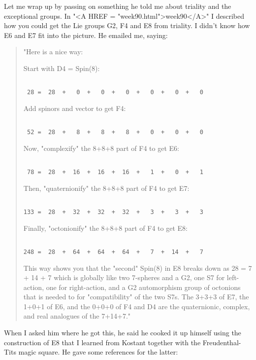 Let me wrap up by passing on something he told me about triality and the
exceptional groups.  In "<A HREF = "week90.html">week90</A>" I
described how you could get the Lie groups G2, F4 and E8 from triality.
I didn't know how E6 and E7 fit into the picture.  He emailed me,
saying:

\begin{quote}

"Here is a nice way:

Start with D4 = Spin(8):


\begin{verbatim}

 28 =  28  +   0  +   0  +   0  +   0  +   0  +   0
\end{verbatim}
    
Add spinors and vector to get F4:


\begin{verbatim}

 52 =  28  +   8  +   8  +   8  +   0  +   0  +   0
\end{verbatim}
    
Now, "complexify" the 8+8+8 part of F4 to get E6:


\begin{verbatim}

 78 =  28  +  16  +  16  +  16  +   1  +   0  +   1
\end{verbatim}
    
Then, "quaternionify" the 8+8+8 part of F4 to get E7:


\begin{verbatim}

133 =  28  +  32  +  32  +  32  +   3  +   3  +   3
\end{verbatim}
    
Finally, "octonionify" the 8+8+8 part of F4 to get E8:


\begin{verbatim}

248 =  28  +  64  +  64  +  64  +   7  +  14  +   7
\end{verbatim}
    
This way shows you that the "second" Spin(8) in E8
breaks down as  28 = 7 + 14 + 7
which is globally like two 7-spheres and a G2,
one S7 for left-action, one for right-action,
and a G2 automorphism group of octonions
that is needed to for "compatibility" of the two S7s.
The  3+3+3 of E7, the 1+0+1 of E6, and the 0+0+0 of F4 and D4
are the quaternionic, complex, and real analogues of the 7+14+7."

\end{quote}
When I asked him where he got this, he said he cooked it up
himself using the construction of E8 that I learned from Kostant
together with the Freudenthal-Tits magic square.  He gave
some references for the latter:

